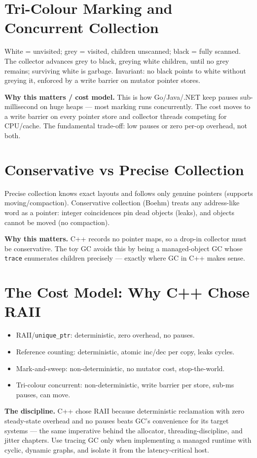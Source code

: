 \section{Tri-Colour Marking and Concurrent Collection}
White = unvisited; grey = visited, children unscanned; black = fully scanned. The collector advances grey to black, greying white children, until no grey remains; surviving white is garbage. Invariant: no black points to white without greying it, enforced by a write barrier on mutator pointer stores.

\textbf{Why this matters / cost model.} This is how Go/Java/.NET keep pauses sub-millisecond on huge heaps --- most marking runs concurrently. The cost moves to a write barrier on every pointer store and collector threads competing for CPU/cache. The fundamental trade-off: low pauses or zero per-op overhead, not both.

\section{Conservative vs Precise Collection}
Precise collection knows exact layouts and follows only genuine pointers (supports moving/compaction). Conservative collection (Boehm) treats any address-like word as a pointer: integer coincidences pin dead objects (leaks), and objects cannot be moved (no compaction).

\textbf{Why this matters.} C++ records no pointer maps, so a drop-in collector must be conservative. The toy GC avoids this by being a managed-object GC whose \texttt{trace} enumerates children precisely --- exactly where GC in C++ makes sense.

\section{The Cost Model: Why C++ Chose RAII}
\begin{itemize}
\item RAII/\texttt{unique\_ptr}: deterministic, zero overhead, no pauses.
\item Reference counting: deterministic, atomic inc/dec per copy, leaks cycles.
\item Mark-and-sweep: non-deterministic, no mutator cost, stop-the-world.
\item Tri-colour concurrent: non-deterministic, write barrier per store, sub-ms pauses, can move.
\end{itemize}

\textbf{The discipline.} C++ chose RAII because deterministic reclamation with zero steady-state overhead and no pauses beats GC's convenience for its target systems --- the same imperative behind the allocator, threading-discipline, and jitter chapters. Use tracing GC only when implementing a managed runtime with cyclic, dynamic graphs, and isolate it from the latency-critical host.
